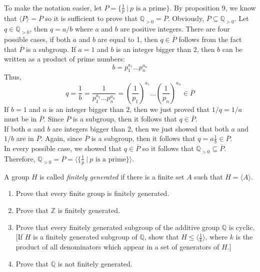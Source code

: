 \begin{solution}
    \\ To make the notation easier, let $P = \{\frac{1}{p} \ | \ p \text{ is a prime}\}$. By proposition 9, we know that $\langle P  \rangle = \overline{P}$ so it is sufficient to prove that $\mathbb{Q}_{>0} = \overline{P}$. Obviously, $\overline{P} \subseteq \mathbb{Q}_{>0}$. Let $q \in \mathbb{Q}_{>0}$, then $q = a/b$ where $a$ and $b$ are positive integers. There are four possible cases, if both $a$ and $b$ are equal to 1, then $q \in \overline{P}$ follows from the fact that $\overline{P}$ is a subgroup. If $a=1$ and $b$ is an integer bigger than 2, then $b$ can be written as a product of prime numbers:
    $$b = p_1^{a_1} \dots p_n^{a_n}$$
    Thus,
    $$q = \frac{1}{b} = \frac{1}{p_1^{a_1} \dots p_n^{a_n}} = \left(\frac{1}{p_1}\right)^{a_1} \dots \left(\frac{1}{p_n}\right)^{a_n} \in \overline{P}$$
    If $b=1$ and $a$ is an integer bigger than 2, then we just proved that $1/q = 1/a$ must be in $\overline{P}$. Since $\overline{P}$ is a subgroup, then it follows that $q \in \overline{P}$. \\
    If both $a$ and $b$ are integers bigger than 2, then we just showed that both $a$ and $1/b$ are in $\overline{P}$. Again, since $\overline{P}$ is a subgroup, then it follows that $q = a\frac{1}{b} \in \overline{P}$.\\
    In every possible case, we showed that $q \in \overline{P}$ so it follows that $\mathbb{Q}_{>0} \subseteq \overline{P}$. Therefore, $\mathbb{Q}_{>0} = \overline{P} = \langle \{\frac{1}{p} \ | \ p \text{ is a prime}\}  \rangle$. \\
\end{solution}

\begin{exercise}
    A group $H$ is called \textit{finitely generated} if there is a finite set $A$ such that $H = \langle A \rangle$.
    \begin{enumerate}[label = \textbf{(\alph*)}]
        \item Prove that every finite group is finitely generated.
        \item Prove that $\mathbb{Z}$ is finitely generated.
        \item Prove that every finitely generated subgroup of the additive group $\mathbb{Q}$ is cyclic. [If $H$ is a finitely generated subgroup of $\mathbb{Q}$, show that $H \leq \langle \frac{1}{k} \rangle$, where $k$ is the product of all denominators which appear in a set of generators of $H$.]
        \item Prove that $\mathbb{Q}$ is not finitely generated. 
    \end{enumerate}
\end{exercise}

